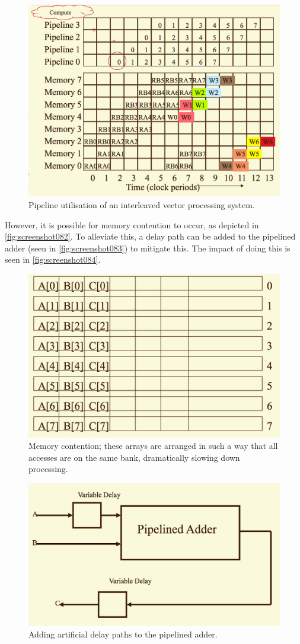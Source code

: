 \begin{figure}
\centering
\includegraphics[width=0.7\linewidth]{screenshot081}
\caption{Pipeline utilisation of an interleaved vector processing system.}
\label{fig:screenshot081}
\end{figure}

However, it is possible for memory contention to occur, as depicted in \autoref{fig:screenshot082}. To alleviate this, a delay path can be added to the pipelined adder (seen in \autoref{fig:screenshot083}) to mitigate this. The impact of doing this is seen in \autoref{fig:screenshot084}.

\begin{figure}
\centering
\includegraphics[width=0.7\linewidth]{screenshot082}
\caption[Memory contention.]{Memory contention; these arrays are arranged in such a way that all accesses are on the same bank, dramatically slowing down processing.}
\label{fig:screenshot082}
\end{figure}

\begin{figure}
\centering
\includegraphics[width=0.7\linewidth]{screenshot083}
\caption{Adding artificial delay paths to the pipelined adder.}
\label{fig:screenshot083}
\end{figure}

